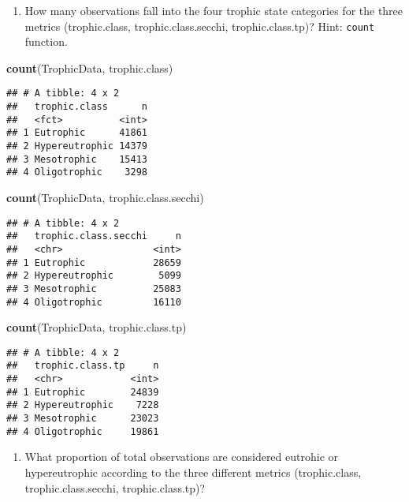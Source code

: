 \documentclass[]{article}
\newenvironment{Shaded}{\begin{snugshade}}{\end{snugshade}}
\newcommand{\KeywordTok}[1]{\textcolor[rgb]{0.13,0.29,0.53}{\textbf{#1}}}
\newcommand{\NormalTok}[1]{#1}
\providecommand{\tightlist}{%
  \setlength{\itemsep}{0pt}\setlength{\parskip}{0pt}}
\begin{document}
\begin{enumerate}
\def\labelenumi{\arabic{enumi}.}
\setcounter{enumi}{5}
\tightlist
\item
  How many observations fall into the four trophic state categories for
  the three metrics (trophic.class, trophic.class.secchi,
  trophic.class.tp)? Hint: \texttt{count} function.
\end{enumerate}

\begin{Shaded}
\begin{Highlighting}[]
\KeywordTok{count}\NormalTok{(TrophicData, trophic.class)}
\end{Highlighting}
\end{Shaded}

\begin{verbatim}
## # A tibble: 4 x 2
##   trophic.class      n
##   <fct>          <int>
## 1 Eutrophic      41861
## 2 Hypereutrophic 14379
## 3 Mesotrophic    15413
## 4 Oligotrophic    3298
\end{verbatim}

\begin{Shaded}
\begin{Highlighting}[]
\KeywordTok{count}\NormalTok{(TrophicData, trophic.class.secchi)}
\end{Highlighting}
\end{Shaded}

\begin{verbatim}
## # A tibble: 4 x 2
##   trophic.class.secchi     n
##   <chr>                <int>
## 1 Eutrophic            28659
## 2 Hypereutrophic        5099
## 3 Mesotrophic          25083
## 4 Oligotrophic         16110
\end{verbatim}

\begin{Shaded}
\begin{Highlighting}[]
\KeywordTok{count}\NormalTok{(TrophicData, trophic.class.tp)}
\end{Highlighting}
\end{Shaded}

\begin{verbatim}
## # A tibble: 4 x 2
##   trophic.class.tp     n
##   <chr>            <int>
## 1 Eutrophic        24839
## 2 Hypereutrophic    7228
## 3 Mesotrophic      23023
## 4 Oligotrophic     19861
\end{verbatim}

\begin{enumerate}
\def\labelenumi{\arabic{enumi}.}
\setcounter{enumi}{6}
\tightlist
\item
  What proportion of total observations are considered eutrohic or
  hypereutrophic according to the three different metrics
  (trophic.class, trophic.class.secchi, trophic.class.tp)?
\end{enumerate}
\end{document}
